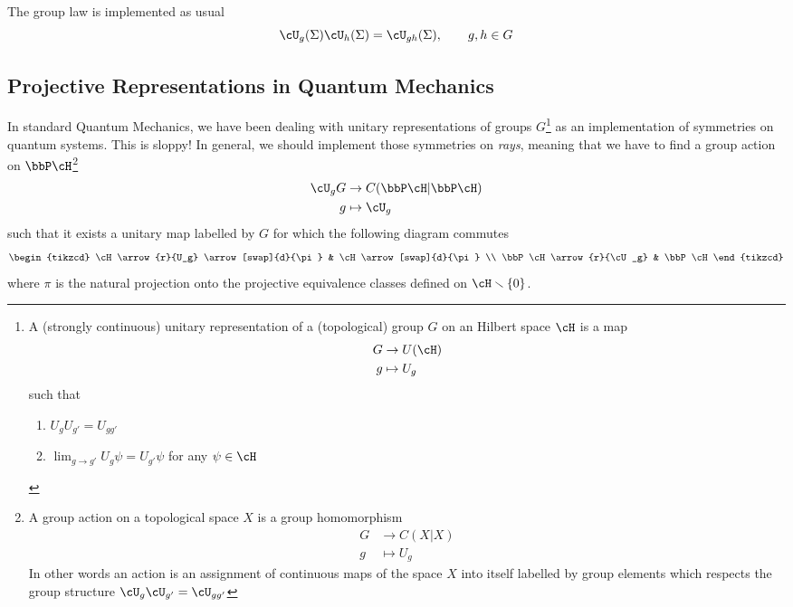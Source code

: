 \documentclass[11pt]{article}
\theoremstyle{definition}
\numberwithin{equation}{section}
\begin{document}
The group law is implemented as usual
\begin{equation}
	\cU_{g}(\Sigma)\cU_{h}(\Sigma)=\cU_{gh}(\Sigma),\qquad g,h\in G
\end{equation}

\subsection{Projective Representations in Quantum Mechanics}

In standard Quantum Mechanics, we have been dealing with unitary representations of groups $G$\footnote{A (strongly continuous) unitary representation of a (topological) group $G$ on an Hilbert space $\cH$ is a map
\begin{equation}
\begin{aligned}
    G &\to U(\cH)\\
g &\mapsto U_g
    \end{aligned}
\end{equation} 
such that
\begin{enumerate}
    \item $U_g U_{g'} = U_{g g'}$
    \item $\lim_{g \to g'} U_g \psi = U_{g'}  \psi$ for any $\psi \in \cH$
\end{enumerate}
} 
as an implementation of symmetries on quantum systems. This is sloppy! In general, we should implement those symmetries on \textit{rays}, meaning that we have to find a group action on $\bbP \cH$\footnote{A group action on a topological space $X$ is a group homomorphism
\begin{equation}
\begin{split}
    G &\to C(X|X)\\
    g &\mapsto U_g
\end{split}
\end{equation} 
In other words an action is an assignment of continuous maps of the space $X$ into itself labelled by group elements which respects the group structure $\cU_g \cU_{g'}= \cU_{gg'}$}
\begin{equation}
    \begin{aligned}
    \cU_{g}G &\to C (\bbP \cH|\bbP \cH)\\
    g &\mapsto \cU_g
    \end{aligned}
\end{equation}
such that it exists a unitary map labelled by $G$ for which the following diagram commutes
\[
\begin{tikzcd}
\cH \arrow{r}{U_g} \arrow[swap]{d}{\pi} & \cH   \arrow[swap]{d}{\pi}  \\
\bbP \cH \arrow{r}{\cU_g} & \bbP \cH  
\end{tikzcd}\]
where $\pi$ is the natural projection onto the projective equivalence classes defined on $\cH \smallsetminus \{0\}$.
\end{document}
